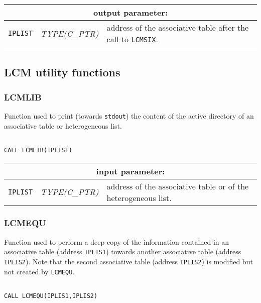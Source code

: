 \vskip 0.8cm

\noindent
\begin{tabular}{|p{1.5cm}|p{3cm}|p{10cm}|}
\hline
\multicolumn{3}{|c|}{\bf output parameter:} \\
\hline
{\tt IPLIST} & {\it TYPE(C\_PTR)} & address of the associative table after the call to {\tt LCMSIX}. \\
\hline
\\
\end{tabular}

\vspace{0.4cm}

\subsection{LCM utility functions}

\subsubsection{LCMLIB}

Function used to print (towards {\tt stdout}) the content of the active directory of an associative table or heterogeneous list.

\begin{verbatim}

CALL LCMLIB(IPLIST)
\end{verbatim}

\noindent
\begin{tabular}{|p{1.5cm}|p{3cm}|p{10cm}|}
\hline
\multicolumn{3}{|c|}{\bf input parameter:} \\
\hline
{\tt IPLIST} & {\it TYPE(C\_PTR)} & address of the associative table or of the heterogeneous list. \\
\hline
\end{tabular}

\subsubsection{LCMEQU}

Function used to perform a deep-copy of the information contained in an associative table (address {\tt IPLIS1}) 
towards another associative table (address {\tt IPLIS2}). Note that the second associative table (address {\tt IPLIS2}) is modified
but not created by {\tt LCMEQU}.

\begin{verbatim}

CALL LCMEQU(IPLIS1,IPLIS2)
\end{verbatim}

